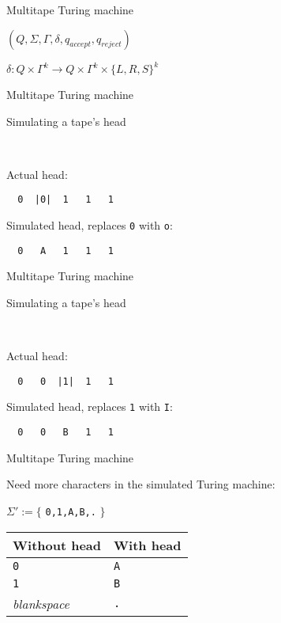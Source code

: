 \documentclass[
  ignorenonframetext,
]{beamer}
\begin{document}
\begin{frame}{Multitape Turing machine}
\protect\hypertarget{multitape-turing-machine}{}

\((Q, \Sigma, \Gamma, \delta, q_{accept}, q_{reject})\)

\(\delta : Q \times \Gamma^k \to Q \times \Gamma^k \times \{L, R, S\}^k\)

\end{frame}

\begin{frame}[fragile]{Multitape Turing machine}
\protect\hypertarget{multitape-turing-machine-1}{}

\begin{block}{Simulating a tape's head}

~

Actual head:

\begin{verbatim}
  0  |0|  1   1   1
\end{verbatim}

Simulated head, replaces \texttt{0} with \texttt{o}:

\begin{verbatim}
  0   A   1   1   1
\end{verbatim}

\end{block}

\end{frame}

\begin{frame}[fragile]{Multitape Turing machine}
\protect\hypertarget{multitape-turing-machine-2}{}

\begin{block}{Simulating a tape's head}

~

Actual head:

\begin{verbatim}
  0   0  |1|  1   1
\end{verbatim}

Simulated head, replaces \texttt{1} with \texttt{I}:

\begin{verbatim}
  0   0   B   1   1
\end{verbatim}

\end{block}

\end{frame}

\begin{frame}[fragile]{Multitape Turing machine}
\protect\hypertarget{multitape-turing-machine-3}{}

Need more characters in the simulated Turing machine:

\(\Sigma':=\{\) \texttt{0,1,A,B,.} \(\}\)

\begin{longtable}[]{@{}ll@{}}
\toprule
Without head & With head\tabularnewline
\midrule
\endhead
\texttt{0} & \texttt{A}\tabularnewline
\texttt{1} & \texttt{B}\tabularnewline
\emph{blankspace} & \texttt{.}\tabularnewline
\bottomrule
\end{longtable}

\end{frame}
\end{document}
